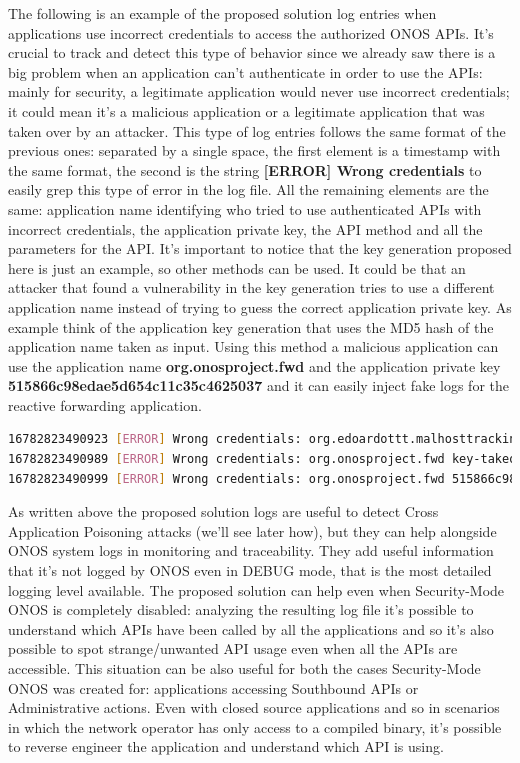The following is an example of the proposed solution log entries when applications use incorrect credentials to access the authorized ONOS APIs. It's crucial to track and detect this type of behavior since we already saw there is a big problem when an application can't authenticate in order to use the APIs: mainly for security, a legitimate application would never use incorrect credentials; it could mean it's a malicious application or a legitimate application that was taken over by an attacker. This type of log entries follows the same format of the previous ones: separated by a single space, the first element is a timestamp with the same format, the second is the string \textbf{[ERROR] Wrong credentials} to easily grep this type of error in the log file. All the remaining elements are the same: application name identifying who tried to use authenticated APIs with incorrect credentials, the application private key, the API method and all the parameters for the API. It's important to notice that the key generation proposed here is just an example, so other methods can be used. It could be that an attacker that found a vulnerability in the key generation tries to use a different application name instead of trying to guess the correct application private key. As example think of the application key generation that uses the MD5 hash of the application name taken as input. Using this method a malicious application can use the application name \textbf{org.onosproject.fwd} and the application private key \textbf{515866c98edae5d654c11c35c4625037} and it can easily inject fake logs for the reactive forwarding application.
\begin{lstlisting}[language=bash]
16782823490923 [ERROR] Wrong credentials: org.edoardottt.malhosttracking.app skbwufuiwfuiwehfuiwwh appendLocation 00:00:00:00:00:04/None of:0000000000000004/1
16782823490989 [ERROR] Wrong credentials: org.onosproject.fwd key-takeover-by-attacker forward of:0000000000000004
16782823490999 [ERROR] Wrong credentials: org.onosproject.fwd 515866c98edae5d654c11c35c4625037 getHost of:0000000000000001
\end{lstlisting}

As written above the proposed solution logs are useful to detect Cross Application Poisoning attacks (we'll see later how), but they can help alongside ONOS system logs in monitoring and traceability. They add useful information that it's not logged by ONOS even in DEBUG mode, that is the most detailed logging level available. The proposed solution can help even when Security-Mode ONOS is completely disabled: analyzing the resulting log file it's possible to understand which APIs have been called by all the applications and so it's also possible to spot strange/unwanted API usage even when all the APIs are accessible. This situation can be also useful for both the cases Security-Mode ONOS was created for: applications accessing Southbound APIs or Administrative actions. Even with closed source applications and so in scenarios in which the network operator has only access to a compiled binary, it's possible to reverse engineer the application and understand which API is using.

